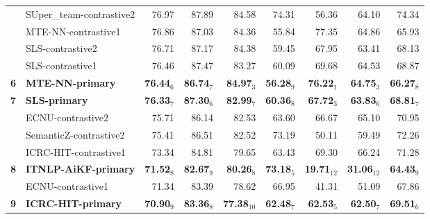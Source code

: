 \begin{table*}[tbh]
\begin{center}
\begin{tabular}{clrrrrrrr}
& SUper\_team-contrastive2 & 76.97 & \scriptsize 87.89 & \scriptsize 84.58 & \scriptsize 74.31 & \scriptsize 56.36 & \scriptsize 64.10 & \scriptsize 74.34 \\
& MTE-NN-contrastive1 & 76.86 & \scriptsize 87.03 & \scriptsize 84.36 & \scriptsize 55.84 & \scriptsize 77.35 & \scriptsize 64.86 & \scriptsize 65.93 \\
& SLS-contrastive2 & 76.71 & \scriptsize 87.17 & \scriptsize 84.38 & \scriptsize 59.45 & \scriptsize 67.95 & \scriptsize 63.41 & \scriptsize 68.13 \\
& SLS-contrastive1 & 76.46 & \scriptsize 87.47 & \scriptsize 83.27 & \scriptsize 60.09 & \scriptsize 69.68 & \scriptsize 64.53 & \scriptsize 68.87 \\
\bf 6 & \bf MTE-NN-primary & \bf 76.44$_{6}$ & \bf \scriptsize 86.74$_{7}$ & \bf \scriptsize 84.97$_{3}$ & \bf \scriptsize 56.28$_{9}$ & \bf \scriptsize 76.22$_{1}$ & \bf \scriptsize 64.75$_{3}$ & \bf \scriptsize 66.27$_{8}$ \\
\bf 7 & \bf SLS-primary & \bf 76.33$_{7}$ & \bf \scriptsize 87.30$_{6}$ & \bf \scriptsize 82.99$_{7}$ & \bf \scriptsize 60.36$_{8}$ & \bf \scriptsize 67.72$_{3}$ & \bf \scriptsize 63.83$_{6}$ & \bf \scriptsize 68.81$_{7}$ \\
& ECNU-contrastive2 & 75.71 & \scriptsize 86.14 & \scriptsize 82.53 & \scriptsize 63.60 & \scriptsize 66.67 & \scriptsize 65.10 & \scriptsize 70.95 \\
& SemanticZ-contrastive2 & 75.41 & \scriptsize 86.51 & \scriptsize 82.52 & \scriptsize 73.19 & \scriptsize 50.11 & \scriptsize 59.49 & \scriptsize 72.26 \\
& ICRC­-HIT-contrastive1 & 73.34 & \scriptsize 84.81 & \scriptsize 79.65 & \scriptsize 63.43 & \scriptsize 69.30 & \scriptsize 66.24 & \scriptsize 71.28 \\
\bf 8 & \bf ITNLP­-AiKF-primary & \bf 71.52$_{8}$ & \bf \scriptsize 82.67$_{9}$ & \bf \scriptsize 80.26$_{8}$ & \bf \scriptsize 73.18$_{5}$ & \bf \scriptsize 19.71$_{12}$ & \bf \scriptsize 31.06$_{12}$ & \bf \scriptsize 64.43$_{9}$ \\
& ECNU-contrastive1 & 71.34 & \scriptsize 83.39 & \scriptsize 78.62 & \scriptsize 66.95 & \scriptsize 41.31 & \scriptsize 51.09 & \scriptsize 67.86 \\
\bf 9 & \bf ICRC­-HIT-primary & \bf 70.90$_{9}$ & \bf \scriptsize 83.36$_{8}$ & \bf \scriptsize 77.38$_{10}$ & \bf \scriptsize 62.48$_{7}$ & \bf \scriptsize 62.53$_{5}$ & \bf \scriptsize 62.50$_{7}$ & \bf \scriptsize 69.51$_{6}$ \\

\end{tabular}
\end{center}
\end{table*}
